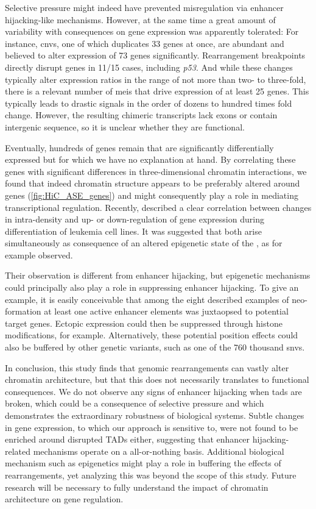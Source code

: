 Selective pressure might indeed have prevented misregulation via enhancer
hijacking-like mechanisms. However, at the same time a great amount of
variability with consequences on gene expression was apparently tolerated: For instance,
\aclp{cnv}, one of which duplicates 33 genes at once, are abundant and believed
to alter expression of 73 genes significantly. Rearrangement breakpoints directly disrupt
genes in 11/15 cases, including \textit{p53}. And while these changes typically
alter expression ratios in the range of not more than two- to three-fold, there
is a relevant number of \aclp{mei} that drive expression of at least 25 genes.
This typically leads to drastic \ase signals in the order of dozens to hundred
times fold change. However, the resulting chimeric transcripts lack exons or
contain intergenic sequence, so it is unclear whether they are functional.

Eventually, hundreds of genes remain that are significantly differentially
expressed but for which we have no explanation at hand. By correlating these
genes with significant differences in three-dimensional chromatin interactions,
we found that indeed chromatin structure appears to be preferably altered around
\ase genes (\cref{fig:HiC_ASE_genes}) and might consequently play a role in
mediating transcriptional regulation. Recently, \citet{Li2018} described a clear
correlation between changes in intra-\tad density and up- or down-regulation of
gene expression during differentiation of leukemia cell lines. It was suggested
that both arise simultaneously as consequence of an altered epigenetic state of
the \tad, as for example \citet{LeDily2014} observed.

Their observation is different from enhancer hijacking,
but epigenetic mechanisms could principally also play a role in suppressing
enhancer hijacking. To give an example, it is easily conceivable that among the eight
described examples of neo-\tad formation at least one
active enhancer elements was juxtaopsed to potential target genes.
Ectopic expression could then be suppressed through histone modifications, for
example. Alternatively, these potential position effects could also be buffered
by other genetic variants, such as one of the 760 thousand \acp{snv}.

In conclusion, this study finds that genomic rearrangements can vastly alter
chromatin architecture, but that this does not necessarily translates to
functional consequences. We do not observe any signs of enhancer hijacking when
\acp{tad} are broken, which could be a consequence of selective pressure and
which demonstrates the extraordinary robustness of biological systems. Subtle
changes in gene expression, to which our approach is sensitive to, were not
found to be enriched around disrupted TADs either, suggesting that enhancer
hijacking-related mechanisms operate on a all-or-nothing basis. Additional
biological mechanism such as epigenetics might play a role in buffering the
effects of rearrangements, yet analyzing this was beyond the scope of this
study. Future research will be necessary to fully understand the impact of
chromatin architecture on gene regulation.

